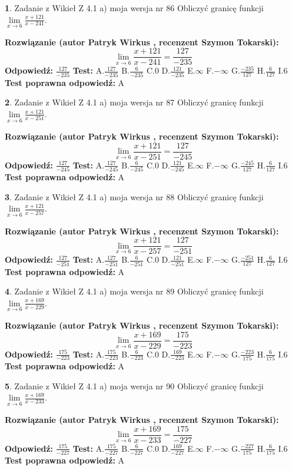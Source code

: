 \documentclass[12pt, a4paper]{article}
\theoremstyle{definition} %
\newtheorem{zad}{}
\newcommand{\zadStart}[1]{\begin{zad}#1\newline}
\newcommand{\zadStop}{\end{zad}}
\newcommand{\rozwStart}[2]{\noindent \textbf{Rozwiązanie (autor #1 , recenzent #2): }\newline}
\newcommand{\rozwStop}{\newline}
\newcommand{\odpStart}{\noindent \textbf{Odpowiedź:}\newline}
\newcommand{\odpStop}{\newline}
\newcommand{\testStart}{\noindent \textbf{Test:}\newline}
\newcommand{\testStop}{\newline}
\newcommand{\kluczStart}{\noindent \textbf{Test poprawna odpowiedź:}\newline}
\newcommand{\kluczStop}{\newline}
\begin{document}
\zadStart{Zadanie z Wikieł Z 4.1 a) moja wersja nr 86}
Obliczyć granicę funkcji $\lim\limits_{x\to6}\frac{x+121}{x-241}$.
\zadStop
\rozwStart{Patryk Wirkus}{Szymon Tokarski}
$$\lim\limits_{x\to6}\frac{x+121}{x-241} = \frac{127}{-235}$$
\rozwStop
\odpStart
$\frac{127}{-235}$
\odpStop
\testStart
A.$\frac{127}{-235}$
B.$\frac{6}{-235}$
C.$0$
D.$\frac{121}{-235}$
E.$\infty$
F.$-\infty$
G.$\frac{-235}{127}$
H.$\frac{6}{127}$
I.$6$
\testStop
\kluczStart
A
\kluczStop



\zadStart{Zadanie z Wikieł Z 4.1 a) moja wersja nr 87}
Obliczyć granicę funkcji $\lim\limits_{x\to6}\frac{x+121}{x-251}$.
\zadStop
\rozwStart{Patryk Wirkus}{Szymon Tokarski}
$$\lim\limits_{x\to6}\frac{x+121}{x-251} = \frac{127}{-245}$$
\rozwStop
\odpStart
$\frac{127}{-245}$
\odpStop
\testStart
A.$\frac{127}{-245}$
B.$\frac{6}{-245}$
C.$0$
D.$\frac{121}{-245}$
E.$\infty$
F.$-\infty$
G.$\frac{-245}{127}$
H.$\frac{6}{127}$
I.$6$
\testStop
\kluczStart
A
\kluczStop



\zadStart{Zadanie z Wikieł Z 4.1 a) moja wersja nr 88}
Obliczyć granicę funkcji $\lim\limits_{x\to6}\frac{x+121}{x-257}$.
\zadStop
\rozwStart{Patryk Wirkus}{Szymon Tokarski}
$$\lim\limits_{x\to6}\frac{x+121}{x-257} = \frac{127}{-251}$$
\rozwStop
\odpStart
$\frac{127}{-251}$
\odpStop
\testStart
A.$\frac{127}{-251}$
B.$\frac{6}{-251}$
C.$0$
D.$\frac{121}{-251}$
E.$\infty$
F.$-\infty$
G.$\frac{-251}{127}$
H.$\frac{6}{127}$
I.$6$
\testStop
\kluczStart
A
\kluczStop



\zadStart{Zadanie z Wikieł Z 4.1 a) moja wersja nr 89}
Obliczyć granicę funkcji $\lim\limits_{x\to6}\frac{x+169}{x-229}$.
\zadStop
\rozwStart{Patryk Wirkus}{Szymon Tokarski}
$$\lim\limits_{x\to6}\frac{x+169}{x-229} = \frac{175}{-223}$$
\rozwStop
\odpStart
$\frac{175}{-223}$
\odpStop
\testStart
A.$\frac{175}{-223}$
B.$\frac{6}{-223}$
C.$0$
D.$\frac{169}{-223}$
E.$\infty$
F.$-\infty$
G.$\frac{-223}{175}$
H.$\frac{6}{175}$
I.$6$
\testStop
\kluczStart
A
\kluczStop



\zadStart{Zadanie z Wikieł Z 4.1 a) moja wersja nr 90}
Obliczyć granicę funkcji $\lim\limits_{x\to6}\frac{x+169}{x-233}$.
\zadStop
\rozwStart{Patryk Wirkus}{Szymon Tokarski}
$$\lim\limits_{x\to6}\frac{x+169}{x-233} = \frac{175}{-227}$$
\rozwStop
\odpStart
$\frac{175}{-227}$
\odpStop
\testStart
A.$\frac{175}{-227}$
B.$\frac{6}{-227}$
C.$0$
D.$\frac{169}{-227}$
E.$\infty$
F.$-\infty$
G.$\frac{-227}{175}$
H.$\frac{6}{175}$
I.$6$
\testStop
\kluczStart
A
\kluczStop
\end{document}
